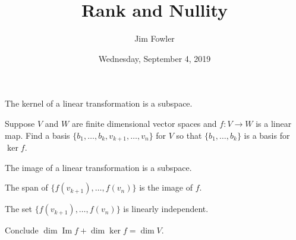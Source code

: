 \documentclass{homework}
\author{Jim Fowler}
\title{Rank and Nullity}
\date{Wednesday, September 4, 2019}
\DeclareMathOperator{\Image}{Im}
\begin{document}
\maketitle

\begin{problem}
  The kernel of a linear transformation is a subspace.
\end{problem}

\vfill

\begin{problem}
  Suppose $V$ and $W$ are finite dimensional vector spaces and
  $f : V \to W$ is a linear map.  Find a basis
  $\{b_1,\ldots,b_k,v_{k+1},\ldots,v_n\}$ for $V$ so that
  $\{b_1,\ldots,b_k\}$ is a basis for $\ker f$.
\end{problem}

\vfill

\begin{problem}
  The image of a linear transformation is a subspace.
\end{problem}

\vfill

\begin{problem}
  The span of $\{ f(v_{k+1}),\ldots,f(v_n)\}$ is the image of $f$.
\end{problem}

\vfill

\begin{problem}
  The set $\{ f(v_{k+1}),\ldots,f(v_n)\}$ is linearly independent.
\end{problem}


\vfill

\begin{problem}
  Conclude
  $\dim \Image f + \dim \ker f = \dim V$.
\end{problem}
\end{document}
